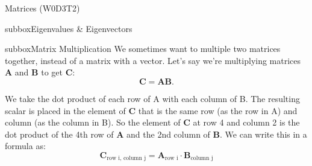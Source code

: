 \begin{textbox}{Matrices (W0D3T2)}
\begin{subbox}{subbox}{Eigenvalues \& Eigenvectors}
\end{subbox}

\begin{subbox}{subbox}{Matrix Multiplication}
\tiny
We sometimes want to multiple two matrices together, instead of a matrix with a vector. Let's say we're multiplying matrices $\mathbf{A}$ and $\mathbf{B}$ to get $\mathbf{C}$:
\begin{equation}
\mathbf{C} = \mathbf{A}\mathbf{B}\text{.}
\end{equation}

We take the dot product of each row of A with each column of B. The resulting scalar is placed in the element of $\mathbf{C}$ that is the same row (as the row in A) and column (as the column in B). So the element of $\mathbf{C}$ at row 4 and column 2 is the dot product of the 4th row of $\mathbf{A}$ and the 2nd column of $\mathbf{B}$. We can write this in a formula as:
\begin{equation}\mathbf{C}_{\text{row i, column j}} = \mathbf{A}_{\text{row i}} \cdot \mathbf{B}_{\text{column j}}
\end{equation}
\end{subbox}
\end{textbox}
